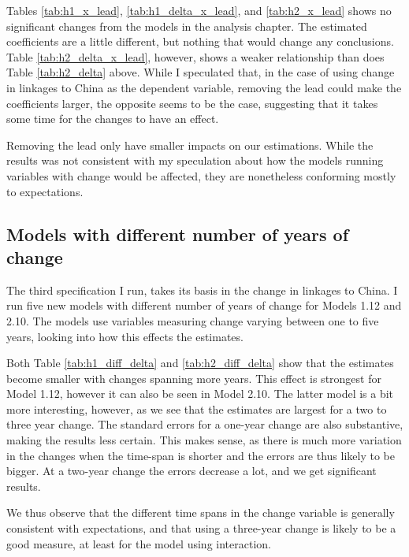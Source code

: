 Tables \ref{tab:h1_x_lead}, \ref{tab:h1_delta_x_lead}, and \ref{tab:h2_x_lead} shows no significant changes from the models in the analysis chapter. The estimated coefficients are a little different, but nothing that would change any conclusions. Table \ref{tab:h2_delta_x_lead}, however, shows a weaker relationship than does Table \ref{tab:h2_delta} above. While I speculated that, in the case of using change in linkages to China as the dependent variable, removing the lead could make the coefficients larger, the opposite seems to be the case, suggesting that it takes some time for the changes to have an effect.

Removing the lead only have smaller impacts on our estimations. While the results was not consistent with my speculation about how the models running variables with change would be affected, they are nonetheless conforming mostly to expectations.

\subsection{Models with different number of years of change}
The third specification I run, takes its basis in the change in linkages to China. I run five new models with different number of years of change for Models 1.12 and 2.10. The models use variables measuring change varying between one to five years, looking into how this effects the estimates.

Both Table \ref{tab:h1_diff_delta} and \ref{tab:h2_diff_delta} show that the estimates become smaller with changes spanning more years. This effect is strongest for Model 1.12, however it can also be seen in Model 2.10. The latter model is a bit more interesting, however, as we see that the estimates are largest for a two to three year change. The standard errors for a one-year change are also substantive, making the results less certain. This makes sense, as there is much more variation in the changes when the time-span is shorter and the errors are thus likely to be bigger. At a two-year change the errors decrease a lot, and we get significant results.

We thus observe that the different time spans in the change variable is generally consistent with expectations, and that using a three-year change is likely to be a good measure, at least for the model using interaction.

